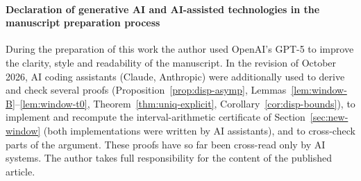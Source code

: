\paragraph{Declaration of generative AI and AI-assisted technologies in the manuscript preparation process}
During the preparation of this work the author used OpenAI's GPT-5 to improve the clarity, style and readability of the manuscript. In the revision of October 2026, AI coding assistants (Claude, Anthropic) were additionally used to derive and check several proofs (Proposition~\ref{prop:disp-asymp}, Lemmas~\ref{lem:window-B}--\ref{lem:window-t0}, Theorem~\ref{thm:uniq-explicit}, Corollary~\ref{cor:disp-bounds}), to implement and recompute the interval-arithmetic certificate of Section~\ref{sec:new-window} (both implementations were written by AI assistants), and to cross-check parts of the argument. These proofs have so far been cross-read only by AI systems. The author takes full responsibility for the content of the published article.

